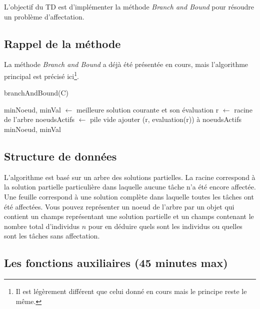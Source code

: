 \documentclass[a4paper,francais]{article}
\theoremstyle{definition}
\begin{document}
L'objectif du TD est d'implémenter la méthode \emph{Branch and Bound}
pour résoudre un problème d'affectation. 

\subsection{Rappel de la méthode}

La méthode \emph{Branch and Bound} a déjà été présentée en cours,
mais l'algorithme principal est précisé ici\footnote{Il est légèrement différent
que celui donné en cours mais le principe reste le même.}. 

  \begin{algorithm}[H]
    \caption{branchAndBound(C)}
    \label{alg:bb}
    minNoeud, minVal $\leftarrow$ meilleure solution courante et son évaluation \;
    r $\leftarrow$ racine de l'arbre \;
    noeudsActifs $\leftarrow$ pile vide \;
    ajouter (r, evaluation(r)) à noeudsActifs \; 
    \Return minNoeud, minVal
  \end{algorithm}

\subsection{Structure de données}

L'algorithme est basé sur un arbre des solutions partielles. La racine
correspond à la solution partielle particulière dans laquelle aucune tâche
n'a été encore affectée. Une feuille correspond à une solution complète
dans laquelle toutes les tâches ont été affectées. 
Vous pouvez représenter un noeud de l'arbre par un objet qui contient
un champs représentant une solution partielle et un champs contenant
le nombre total d'individus $n$ pour en déduire quels sont les individus
ou quelles sont les tâches sans affectation.  

\subsection{Les fonctions auxiliaires (45 minutes max)}
\end{document}
